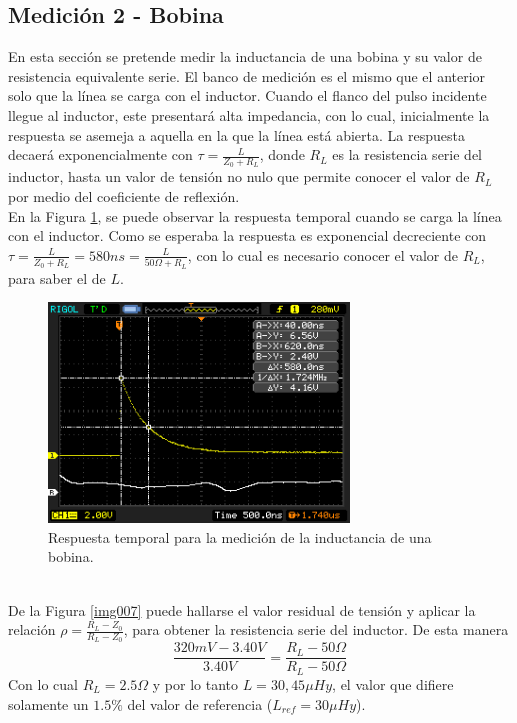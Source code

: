 \documentclass[a4paper,10pt]{article}
\begin{document}
	\subsection{Medición 2 - Bobina}
	En esta secci\'on se pretende medir la inductancia de una bobina y su valor de resistencia equivalente serie. El banco de medici\'on es el mismo que el anterior solo que la l\'inea se carga con el inductor.
	Cuando el flanco del pulso incidente llegue al inductor, este presentar\'a alta impedancia, con lo cual, inicialmente la respuesta se asemeja a aquella en la que la l\'inea est\'a abierta. La respuesta decaer\'a exponencialmente con $\tau=\frac{L}{Z_0+R_L}$, donde $R_L$ es la resistencia serie del inductor, hasta un valor de tensi\'on no nulo que permite conocer el valor de $R_L$ por medio del coeficiente de reflexi\'on.\\
	En la Figura \ref{img006}, se puede observar la respuesta temporal cuando se carga la l\'inea con el inductor. Como se esperaba la respuesta es exponencial decreciente con $\tau=\frac{L}{Z_0+R_L}=580ns=\frac{L}{50\Omega+R_L}$, con lo cual es necesario conocer el valor de $R_L$, para saber el de $L$.
		\begin{figure}[!htb]
			\centering
			\includegraphics[width=8cm]
			{Imagenes/InductorL.png}
			\caption{Respuesta temporal para la medici\'on de la inductancia de una bobina.}
			\label{img006}
		\end{figure}\\
	De la Figura \ref{img007} puede hallarse el valor residual de tensi\'on y aplicar la relaci\'on  $\rho=\frac{R_L-Z_0}{R_L-Z_0}$, para obtener la resistencia serie del inductor. De esta manera $$\frac{320mV-3.40V}{3.40V}=\frac{R_L-50\Omega}{R_L-50\Omega}$$
	Con lo cual $R_L=2.5\Omega$ y por lo tanto $L=30,45\mu Hy$, el valor que difiere solamente un $1.5\% $ del valor de referencia ($L_{ref}=30\mu Hy$).
	
\end{document}
